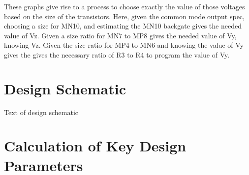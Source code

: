 \documentclass[12pt,a4paper]{article}
\begin{document}
These graphs give rise to a process to choose exactly the value of those voltages based on the size of the transistors.
Here, given the common mode output spec, choosing a size for MN10, and estimating the MN10 backgate gives the needed value of Vz.
Given a size ratio for MN7 to MP8 gives the needed value of Vy, knowing Vz.
Given the size ratio for MP4 to MN6 and knowing the value of Vy gives the gives the necessary ratio of R3 to R4 to program the value of Vy.

\pagebreak



\section{Design Schematic}
Text of design schematic

\pagebreak



\section{Calculation of Key Design Parameters}
\end{document}
